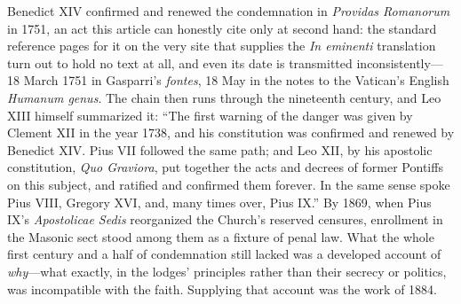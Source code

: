 Benedict XIV confirmed and renewed the condemnation in \emph{Providas Romanorum} in 1751, an act this article can honestly cite only at second hand: the standard reference pages for it on the very site that supplies the \emph{In eminenti} translation turn out to hold no text at all, and even its date is transmitted inconsistently---18 March 1751 in Gasparri's \emph{fontes}, 18 May in the notes to the Vatican's English \emph{Humanum genus}. The chain then runs through the nineteenth century, and Leo XIII himself summarized it: ``The first warning of the danger was given by Clement XII in the year 1738, and his constitution was confirmed and renewed by Benedict XIV. Pius VII followed the same path; and Leo XII, by his apostolic constitution, \emph{Quo Graviora}, put together the acts and decrees of former Pontiffs on this subject, and ratified and confirmed them forever. In the same sense spoke Pius VIII, Gregory XVI, and, many times over, Pius IX.'' By 1869, when Pius IX's \emph{Apostolicae Sedis} reorganized the Church's reserved censures, enrollment in the Masonic sect stood among them as a fixture of penal law. What the whole first century and a half of condemnation still lacked was a developed account of \emph{why}---what exactly, in the lodges' principles rather than their secrecy or politics, was incompatible with the faith. Supplying that account was the work of 1884.
